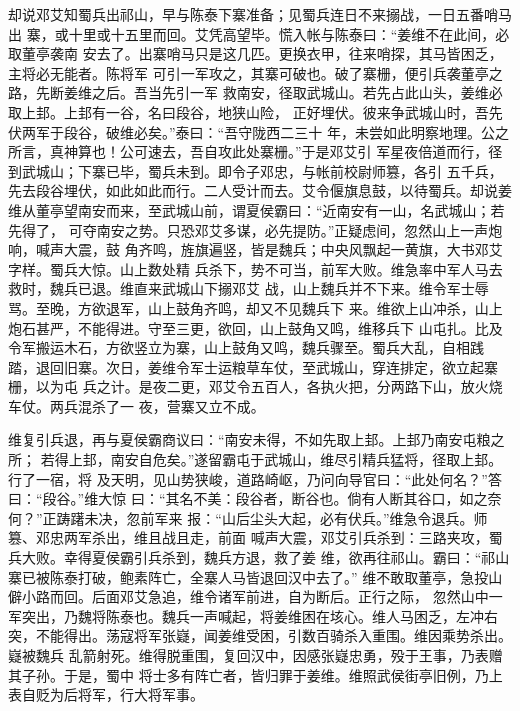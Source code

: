 却说邓艾知蜀兵出祁山，早与陈泰下寨准备；见蜀兵连日不来搦战，一日五番哨马出
寨，或十里或十五里而回。艾凭高望毕。慌入帐与陈泰曰：“姜维不在此间，必取董亭袭南
安去了。出寨哨马只是这几匹。更换衣甲，往来哨探，其马皆困乏，主将必无能者。陈将军
可引一军攻之，其寨可破也。破了寨栅，便引兵袭董亭之路，先断姜维之后。吾当先引一军
救南安，径取武城山。若先占此山头，姜维必取上邽。上邽有一谷，名曰段谷，地狭山险，
正好埋伏。彼来争武城山时，吾先伏两军于段谷，破维必矣。”泰曰：“吾守陇西二三十
年，未尝如此明察地理。公之所言，真神算也！公可速去，吾自攻此处寨栅。”于是邓艾引
军星夜倍道而行，径到武城山；下寨已毕，蜀兵未到。即令子邓忠，与帐前校尉师篡，各引
五千兵，先去段谷埋伏，如此如此而行。二人受计而去。艾令偃旗息鼓，以待蜀兵。却说姜
维从董亭望南安而来，至武城山前，谓夏侯霸曰：“近南安有一山，名武城山；若先得了，
可夺南安之势。只恐邓艾多谋，必先提防。”正疑虑间，忽然山上一声炮响，喊声大震，鼓
角齐鸣，旌旗遍竖，皆是魏兵；中央风飘起一黄旗，大书邓艾字样。蜀兵大惊。山上数处精
兵杀下，势不可当，前军大败。维急率中军人马去救时，魏兵已退。维直来武城山下搦邓艾
战，山上魏兵并不下来。维令军士辱骂。至晚，方欲退军，山上鼓角齐鸣，却又不见魏兵下
来。维欲上山冲杀，山上炮石甚严，不能得进。守至三更，欲回，山上鼓角又鸣，维移兵下
山屯扎。比及令军搬运木石，方欲竖立为寨，山上鼓角又鸣，魏兵骤至。蜀兵大乱，自相践
踏，退回旧寨。次日，姜维令军士运粮草车仗，至武城山，穿连排定，欲立起寨栅，以为屯
兵之计。是夜二更，邓艾令五百人，各执火把，分两路下山，放火烧车仗。两兵混杀了一
夜，营寨又立不成。

维复引兵退，再与夏侯霸商议曰：“南安未得，不如先取上邽。上邽乃南安屯粮之所；
若得上邽，南安自危矣。”遂留霸屯于武城山，维尽引精兵猛将，径取上邽。行了一宿，将
及天明，见山势狭峻，道路崎岖，乃问向导官曰：“此处何名？”答曰：“段谷。”维大惊
曰：“其名不美：段谷者，断谷也。倘有人断其谷口，如之奈何？”正踌躇未决，忽前军来
报：“山后尘头大起，必有伏兵。”维急令退兵。师篡、邓忠两军杀出，维且战且走，前面
喊声大震，邓艾引兵杀到：三路夹攻，蜀兵大败。幸得夏侯霸引兵杀到，魏兵方退，救了姜
维，欲再往祁山。霸曰：“祁山寨已被陈泰打破，鲍素阵亡，全寨人马皆退回汉中去了。”
维不敢取董亭，急投山僻小路而回。后面邓艾急追，维令诸军前进，自为断后。正行之际，
忽然山中一军突出，乃魏将陈泰也。魏兵一声喊起，将姜维困在垓心。维人马困乏，左冲右
突，不能得出。荡寇将军张嶷，闻姜维受困，引数百骑杀入重围。维因乘势杀出。嶷被魏兵
乱箭射死。维得脱重围，复回汉中，因感张嶷忠勇，殁于王事，乃表赠其子孙。于是，蜀中
将士多有阵亡者，皆归罪于姜维。维照武侯街亭旧例，乃上表自贬为后将军，行大将军事。

